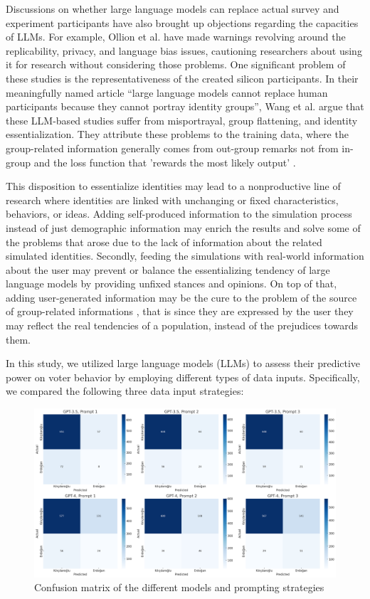 \documentclass[sigconf,natbib=false]{acmart}
\begin{document}
Discussions on whether large language models can replace actual survey and experiment participants have also brought up objections regarding the capacities of LLMs. For example, Ollion et al. \cite{Ollion2024} have made warnings revolving around the replicability, privacy, and language bias issues, cautioning researchers about using it for research without considering those problems. One significant problem of these studies is the representativeness of the created silicon participants. In their meaningfully named article “large language models cannot replace human participants because they cannot portray identity groups”, Wang et al. \cite{Wang2024} argue that these LLM-based studies suffer from misportrayal, group flattening, and identity essentialization. They attribute these problems to the training data, where the group-related information generally comes from out-group remarks not from in-group and the loss function that 'rewards the most likely output' \cite{Wang2024}.

This disposition to essentialize identities may lead to a nonproductive line of research where identities are linked with unchanging or fixed characteristics, behaviors, or ideas. Adding self-produced information to the simulation process instead of just demographic information may enrich the results and solve some of the problems that arose due to the lack of information about the related simulated identities. Secondly, feeding the simulations with real-world information about the user may prevent or balance the essentializing tendency of large language models by providing unfixed stances and opinions. On top of that, adding user-generated information may be the cure to the problem of the source of group-related informations \cite{Wang2024}, that is since they are expressed by the user they may reflect the real tendencies of a population, instead of the prejudices towards them.

In this study, we utilized large language models (LLMs) to assess their predictive power on voter behavior by employing different types of data inputs. Specifically, we compared the following three data input strategies:

\begin{figure}[ht]
    \centering
    \includegraphics[width=\textwidth]{confusion_matrices.png}
    \caption{Confusion matrix of the different models and prompting strategies}
    \label{fig:confusion}
\end{figure}
\end{document}
